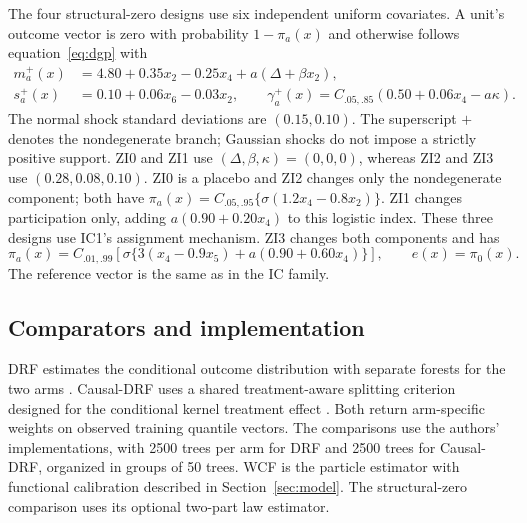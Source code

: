 \documentclass[11pt]{article}
\begin{document}
The four structural-zero designs use six independent uniform covariates. A unit's outcome vector is zero with probability $1-\pi_a(x)$ and otherwise follows equation~\eqref{eq:dgp} with
\begin{align*}
 m_a^+(x)&=4.80+0.35x_2-0.25x_4+a(\Delta+\beta x_2),\\
 s_a^+(x)&=0.10+0.06x_6-0.03x_2,\qquad
 \gamma_a^+(x)=C_{.05,.85}(0.50+0.06x_4-a\kappa).
\end{align*}
The normal shock standard deviations are $(0.15,0.10)$. The superscript $+$ denotes the nondegenerate branch; Gaussian shocks do not impose a strictly positive support. ZI0 and ZI1 use $(\Delta,\beta,\kappa)=(0,0,0)$, whereas ZI2 and ZI3 use $(0.28,0.08,0.10)$. ZI0 is a placebo and ZI2 changes only the nondegenerate component; both have $\pi_a(x)=C_{.05,.95}\{\sigma(1.2x_4-0.8x_2)\}$. ZI1 changes participation only, adding $a(0.90+0.20x_4)$ to this logistic index. These three designs use IC1's assignment mechanism. ZI3 changes both components and has
\[
 \pi_a(x)=C_{.01,.99}[\sigma\{3(x_4-0.9x_5)+a(0.90+0.60x_4)\}],
 \qquad e(x)=\pi_0(x).
\]
The reference vector is the same as in the IC family.



\subsection{Comparators and implementation}\label{sec:implementation}

DRF estimates the conditional outcome distribution with separate forests for the two arms \citep{DRF-paper}. Causal-DRF uses a shared treatment-aware splitting criterion designed for the conditional kernel treatment effect \citep{naf2026causaldrf}. Both return arm-specific weights on observed training quantile vectors. The comparisons use the authors' implementations, with 2500 trees per arm for DRF and 2500 trees for Causal-DRF, organized in groups of 50 trees. WCF is the particle estimator with functional calibration described in Section~\ref{sec:model}. The structural-zero comparison uses its optional two-part law estimator.
\end{document}
